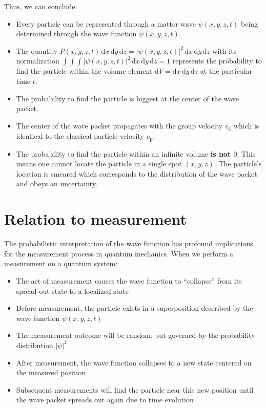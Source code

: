 \documentclass[
  a4paper,
]{book}
\providecommand{\tightlist}{%
  \setlength{\itemsep}{0pt}\setlength{\parskip}{0pt}}
\begin{document}
Thus, we can conclude:

\begin{itemize}
\item
  Every particle can be represented through a matter wave
  \(\psi \left( x,y,z, t \right)\) being determined through the wave
  function \(\psi \left( x,y,z, t \right)\).
\item
  The quantity
  \(P \left( x,y,z, t \right) \, \mathrm{d}x \, \mathrm{d}y \, \mathrm{d}z = \left| \psi \left( x,y,z, t \right) \right|^2 \, \mathrm{d}x \, \mathrm{d}y \, \mathrm{d}z\)
  with its normalization
  \(\int\int\int \left| \psi \left( x,y,z, t \right) \right|^2 \, \mathrm{d}x \, \mathrm{d}y \, \mathrm{d}z = 1\)
  represents the probability to find the particle within the volume
  element \(\mathrm{d} V = \mathrm{d}x \, \mathrm{d}y \, \mathrm{d}z\)
  at the particular time \(t\).
\item
  The probability to find the particle is biggest at the center of the
  wave packet.
\item
  The center of the wave packet propagates with the group velocity
  \(v_{\mathrm{g}}\) which is identical to the classical particle
  velocity \(v_{\mathrm{p}}\).
\item
  The probability to find the particle within an infinite volume
  \textbf{is not \(0\)}. This means one cannot locate the particle in a
  single spot \(\left( x,y,z \right)\). The particle's location is
  smeared which corresponds to the distribution of the wave packet and
  obeys an uncertainty.
\end{itemize}

\section{Relation to measurement}\label{relation-to-measurement}

The probabilistic interpretation of the wave function has profound
implications for the measurement process in quantum mechanics. When we
perform a measurement on a quantum system:

\begin{itemize}
\tightlist
\item
  The act of measurement causes the wave function to ``collapse'' from
  its spread-out state to a localized state
\item
  Before measurement, the particle exists in a superposition described
  by the wave function \(\psi(x,y,z,t)\)
\item
  The measurement outcome will be random, but governed by the
  probability distribution \(|\psi|^2\)
\item
  After measurement, the wave function collapses to a new state centered
  on the measured position
\item
  Subsequent measurements will find the particle near this new position
  until the wave packet spreads out again due to time evolution
\end{itemize}
\end{document}
